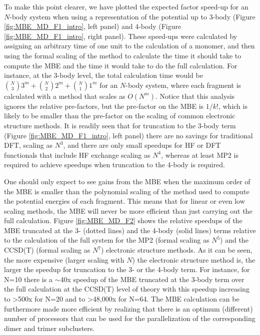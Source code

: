 \documentclass[11pt, proquest]{uwthesis}[2020/02/24]
\begin{document}
\par To make this point clearer, we have plotted the expected factor speed-up for an $N$-body system when using a representation of the potential up to 3-body (Figure \ref{fig:MBE_MD_F1_intro}, left panel) and 4-body (Figure \ref{fig:MBE_MD_F1_intro}, right panel). These speed-ups were calculated by assigning an arbitrary time of one unit to the calculation of a monomer, and then using the formal scaling of the method to calculate the time it should take to compute the MBE and the time it would take to do the full calculation. For instance, at the 3-body level, the total calculation time would be $\binom{N}{3}3^m+\binom{N}{2}2^m+\binom{N}{1}1^m$ for an $N$-body system, where each fragment is calculated with a method that scales as $O(N^m)$. Notice that this analysis ignores the relative pre-factors, but the pre-factor on the MBE is $1/k!$, which is likely to be smaller than the pre-factor on the scaling of common electronic structure methods. It is readily seen that for truncation to the 3-body term (Figure \ref{fig:MBE_MD_F1_intro}, left panel) there are no savings for traditional DFT, scaling as $N^3$, and there are only small speedups for HF or DFT functionals that include HF exchange scaling as $N^4$, whereas at least MP2 is required to achieve speedups when truncation to the 4-body is required.



\par One should only expect to see gains from the MBE when the maximum order of the MBE is smaller than the polynomial scaling of the method used to compute the potential energies of each fragment. This means that for linear or even low scaling methods, the MBE will never be more efficient than just carrying out the full calculation. Figure \ref{fig:MBE_MD_F2} shows the relative speedups of the MBE truncated at the 3- (dotted lines) and the 4-body (solid lines) terms relative to the calculation of the full system for the MP2 (formal scaling as $N^5$) and the CCSD(T) (formal scaling as $N^7$) electronic structure methods. As it can be seen, the more expensive (larger scaling with $N$) the electronic structure method is, the larger the speedup for truncation to the 3- or the 4-body term. For instance, for N=10 there is a $\sim$40x speedup of the MBE truncated at the 3-body term over the full calculation at the CCSD(T) level of theory with this speedup increasing to \textgreater500x for N=20 and to \textgreater48,000x for N=64. The MBE calculation can be furthermore made more efficient by realizing that there is an optimum (different) number of processors that can be used for the parallelization of the corresponding dimer and trimer subclusters.
\end{document}
